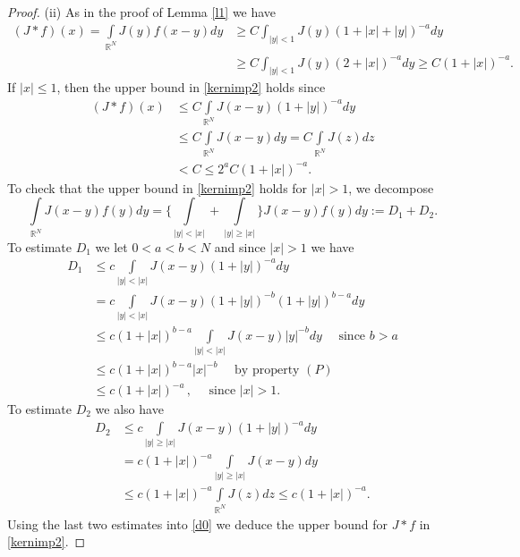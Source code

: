 \documentclass[10pt,a4paper]{amsart}
\newcommand{\R}{\mathbb R}
\newcommand{\intl}{\int\limits}
\begin{document}
\begin{proof}
(ii) As in the proof of Lemma \ref{l1} we have
$$
\begin{aligned}
(J*f)(x)=\intl_{\R^N} J(y)f(x-y)d y & \geq C  \int_{|y|<1} J(y) (1+|x|+|y|)^{-a} dy \\
& \geq C \int_{|y|<1} J(y) (2+|x|)^{-a} dy \geq  C (1+|x|)^{-a}.
\end{aligned}
$$
If $|x|\leq 1$, then the upper bound in \eqref{kernimp2} holds since
$$
\begin{aligned}
(J*f)(x) & \leq C\intl_{\R^N} J(x-y)(1+|y|)^{-a} dy\\
& \leq C\intl_{\R^N}J(x-y)dy=C\intl_{\R^N}J(z) dz\\
&<C\leq 2^{a}C(1+|x|)^{-a}.
\end{aligned}
$$
To check that the upper bound in \eqref{kernimp2} holds for $|x|>1$, we decompose
\begin{equation}\label{d0}
\intl_{\R^N} J(x-y)f(y) dy=\Big\{ \intl_{|y|<|x|} +\intl_{|y|\geq |x|} \Big\} J(x-y)f(y) dy:=D_1+D_2.
\end{equation}
To estimate $D_1$ we let $0<a<b<N$ and since $|x|>1$ we have
$$
\begin{aligned}
D_1&\leq c \intl_{|y|<|x|} J(x-y)(1+|y|)^{-a} dy\\
&= c \intl_{|y|<|x|} J(x-y)(1+|y|)^{-b} (1+|y|)^{b-a} dy\\
&\leq c (1+|x|)^{b-a} \intl_{|y|<|x|} J(x-y) |y|^{-b} dy \quad \mbox{ since $b>a$}\\
&\leq c (1+|x|)^{b-a} |x|^{-b} \quad\mbox{ by property $(P)$}\\
&\leq c(1+|x|)^{-a} \, , \quad\mbox{ since } |x|>1.
\end{aligned}
$$
To estimate $D_2$ we also have
$$
\begin{aligned}
D_2&\leq c \intl_{|y|\geq |x|} J(x-y)(1+|y|)^{-a} dy\\
&= c (1+|x|)^{-a} \intl_{|y|\geq |x|} J(x-y)  dy\\
&\leq  c (1+|x|)^{-a} \intl_{\R^N} J(z)  dz \leq c(1+|x|)^{-a}.
\end{aligned}
$$
Using the last two estimates into \eqref{d0} we deduce the upper bound for $J*f$ in  \eqref{kernimp2}.
\end{proof}
\end{document}
